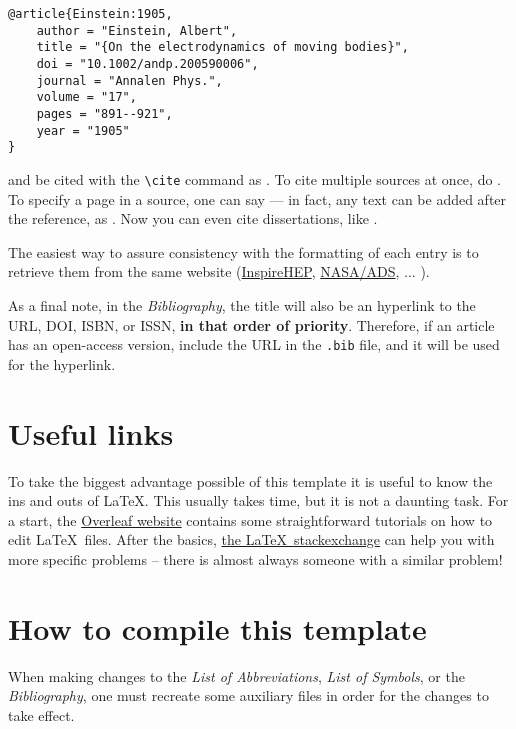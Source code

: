 \begin{verbatim}
@article{Einstein:1905,
	author = "Einstein, Albert",
	title = "{On the electrodynamics of moving bodies}",
	doi = "10.1002/andp.200590006",
	journal = "Annalen Phys.",
	volume = "17",
	pages = "891--921",
	year = "1905"
}
\end{verbatim}
%
and be cited with the \verb|\cite| command as \cite{Einstein:1905}. To cite multiple sources at once, do \cite{Mertig:1990:feyncalc,Shtabovenko:2016:feyncalc,Shtabovenko:2020:feyncalc}. To specify a page in a source, one can say \cite[p.~500]{Dokshitzer:1991} --- in fact, any text can be added after the reference, as \cite[Any text you might want]{Peskin:1995}. Now you can even cite dissertations, like \cite{Feynman:1942}.

The easiest way to assure consistency with the formatting of each entry is to retrieve them from the same website (\href{https://inspirehep.net/}{InspireHEP}, \href{https://ui.adsabs.harvard.edu/}{NASA/ADS}, ... ).

As a final note, in the \textit{Bibliography}, the title will also be an hyperlink to the URL, DOI, ISBN, or ISSN, \textbf{in that order of priority}. Therefore, if an article has an open-access version, include the URL in the \texttt{.bib} file, and it will be used for the hyperlink.

\section{Useful links}
%
To take the biggest advantage possible of this template it is useful to know the ins and outs of \LaTeX. This usually takes time, but it is not a daunting task. For a start, the \href{https://www.overleaf.com/learn}{Overleaf website} contains some straightforward tutorials on how to edit \LaTeX\, files. After the basics, \href{https://tex.stackexchange.com}{the \LaTeX\, stackexchange} can help you with more specific problems -- there is almost always someone with a similar problem!

\section{How to compile this template}

When making changes to the \textit{List of Abbreviations}, \textit{List of Symbols}, or the \textit{Bibliography}, one must recreate some auxiliary files in order for the changes to take effect.


